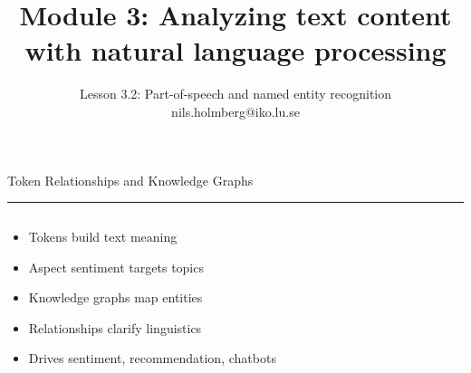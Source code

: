 \documentclass[aspectratio=169]{beamer}
\title{Module 3: Analyzing text content with natural language processing}
\subtitle{Lesson 3.2: Part-of-speech and named entity recognition \\[0.8em]nils.holmberg@iko.lu.se}
\author{}
\newcommand{\TitleFont}{\rmfamily}
\begin{document}
\begin{frame}[plain]
  \titlepage
\end{frame}
\setcounter{framenumber}{0} %

\begin{frame}[t]{}
  \vspace*{0.5cm}
  {\TitleFont\fontsize{18}{22}\selectfont\color{LUBronze}Token Relationships and Knowledge Graphs\par}
  \vspace{0.3em}
  {\color{LUBronze}\rule{\linewidth}{0.8pt}}\par
  \vspace{0.2cm}
  \begin{columns}[t]
    \begin{column}[t]{0.45\textwidth}
      \vspace*{0pt}
      \begin{itemize}\setlength\itemsep{0.65em}
        \item Tokens build text meaning
        \item Aspect sentiment targets topics
        \item Knowledge graphs map entities
        \item Relationships clarify linguistics
        \item Drives sentiment, recommendation, chatbots
      \end{itemize}
    \end{column}
  \end{columns}
\end{frame}
\end{document}
